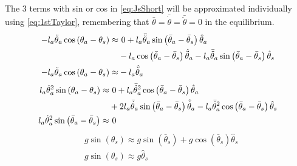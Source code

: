 		The 3 terms with sin or cos in \autoref{eq:JsShort} will be approximated individually using \autoref{eq:1stTaylor}, remembering that $\bar{\theta}=\bar{\dot{\theta}}=\bar{\ddot{\theta}}=0$ in the equilibrium.
		\begin{subequations}
			\begin{flalign}
				-l_a\ddot{\theta}_a\cos\left(\theta_a-\theta_s\right)  \approx & \ 0 + l_a\bar{\ddot{\theta}}_a\sin\left(\bar{\theta}_a-\bar{\theta}_s\right)\hat{\theta}_a  \notag \\ 
				& -l_a\cos\left(\bar{\theta}_a-\bar{\theta}_s\right)\hat{\ddot{\theta}}_a - l_a\bar{\ddot{\theta}}_a\sin\left(\bar{\theta}_a-\bar{\theta}_s\right)\hat{\theta}_s   \\
				-l_a\ddot{\theta}_a\cos\left(\theta_a-\theta_s\right) \approx &-l_a\hat{\ddot{\theta}}_a 
			\end{flalign} %
		\end{subequations}
		\begin{subequations}
			\begin{flalign}
				l_a\dot{\theta}_a^2\sin\left(\theta_a-\theta_s\right)  \approx &\ 0 + l_a\bar{\dot{\theta}}_a^2\cos\left(\bar{\theta}_a-\bar{\theta}_s\right)\hat{\theta}_a  \notag \\
				& + 2l_a\bar{\dot{\theta}}_a\sin\left(\bar{\theta}_a-\bar{\theta}_s\right)\hat{\dot{\theta}}_a-l_a\bar{\dot{\theta}}_a^2\cos\left(\bar{\theta}_a-\bar{\theta}_s\right)\hat{\theta}_s   \\
				l_a\dot{\theta}_a^2\sin\left(\bar{\theta}_a-\bar{\theta}_s\right) \approx & \ 0 
			\end{flalign}
		\end{subequations}
		\begin{subequations}
			\begin{flalign}
				& g\sin\left(\theta_s\right) \approx g\sin\left(\bar{\theta}_s\right) +g\cos\left(\bar{\theta}_s\right)\hat{\theta}_s \\
				& g\sin\left(\theta_s\right) \approx g\hat{\theta}_s 
			\end{flalign}
		\end{subequations}
		

